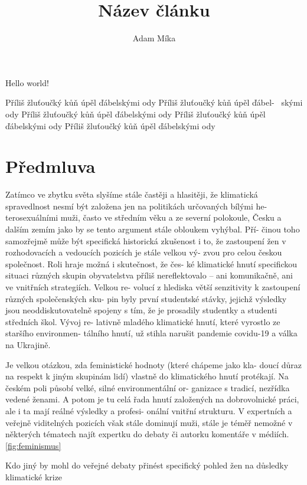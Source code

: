 \documentclass[12pt, a4paper]{article}
\title{Název článku}
\author{Adam Míka}
\begin{document}
\maketitle

Hello world!

\tableofcontents

Příliš žluťoučký kůň úpěl ďábelskými ody
Příliš žluťoučký kůň úpěl ďábel- \ skými ody
Příliš žluťoučký kůň úpěl ďábelskými ody
Příliš žluťoučký kůň úpěl ďábelskými ody
Příliš žluťoučký kůň úpěl ďábelskými ody

\section{Předmluva}
Zatímco ve zbytku světa slyšíme stále častěji a hlasitěji, že klimatická
spravedlnost nesmí být založena jen na politikách určovaných bílými he-
terosexuálními muži, často ve středním věku a ze severní polokoule, Česku
a dalším zemím jako by se tento argument stále obloukem vyhýbal. Pří-
činou toho samozřejmě může být specifická historická zkušenost i to, že
zastoupení žen v rozhodovacích a vedoucích pozicích je stále velkou vý-
zvou pro celou českou společnost. Roli hraje možná i skutečnost, že čes-
ké klimatické hnutí specifickou situaci různých skupin obyvatelstva příliš
nereflektovalo – ani komunikačně, ani ve vnitřních strategiích. Velkou re-
volucí z hlediska větší senzitivity k zastoupení různých společenských sku-
pin byly první studentské stávky, jejichž výsledky jsou neoddiskutovatelně
spojeny s tím, že je prosadily studentky a studenti středních škol. Vývoj re-
lativně mladého klimatické hnutí, které vyrostlo ze staršího environmen-
tálního hnutí, už stihla narušit pandemie covidu-19 a válka na Ukrajině.

Je velkou otázkou, zda feministické hodnoty (které chápeme jako kla-
doucí důraz na respekt k jiným skupinám lidí) vlastně do klimatického
hnutí protékají. Na českém poli působí velké, silné environmentální or-
ganizace s tradicí, nezřídka vedené ženami. A potom je tu celá řada hnutí
založených na dobrovolnické práci, ale i ta mají reálné výsledky a profesi-
onální vnitřní strukturu. V expertních a veřejně viditelných pozicích však
stále dominují muži, stále je téměř nemožné v některých tématech najít
expertku do debaty či autorku komentáře v médiích. \ref{fig:feminismus}

Kdo jiný by mohl do
veřejné debaty přinést specifický pohled žen na důsledky klimatické krize \pageref{tab:metodologie}
\end{document}

